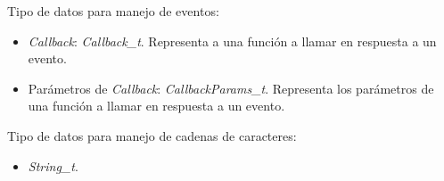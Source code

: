 Tipo de datos para manejo de eventos:

\begin{itemize}
\item
\emph{Callback}: \emph{Callback\_t}. Representa a una función a llamar en respuesta a un evento.
\item
Parámetros de \emph{Callback}: \emph{CallbackParams\_t}. Representa los parámetros de una función a llamar en respuesta a un evento.
\end{itemize}

Tipo de datos para manejo de cadenas de caracteres:

\begin{itemize}
\item
\emph{String\_t}.
\end{itemize}















